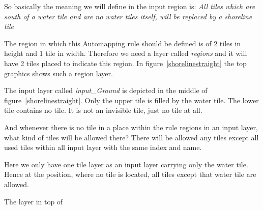 So basically the meaning we will define in the input region is:
\emph{All tiles which are south of a water tile and are no water tiles itself,
will be replaced by a shoreline tile}

The region in which this Automapping rule should be defined is of 2 tiles in height and 
1 tile in width. Therefore we need a layer called \emph{regions} and it will have 2 tiles placed
to indicate this region. In figure~\ref{shorelinestraight} the top graphics shows such a region
layer.

The input layer called \emph{input\_Ground} is depicted in the middle of 
figure~\ref{shorelinestraight}. Only the upper tile is filled by the water
tile. The lower tile contains no tile. It is not an invisible tile, just no
tile at all. 

And whenever there is no tile in a place within the rule regions in an input layer,
what kind of tiles will be allowed there? There will be allowed any tiles except 
all used tiles within all input layer with the same index and name.

Here we only have one tile layer as an input layer carrying only the water tile.
Hence at the position, where no tile is located, all tiles except that water tile
are allowed.

The layer in top of 
